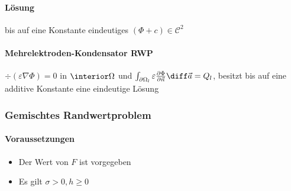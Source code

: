 \begin{sectionbox}
\begin{center}
            \paragraph{Lösung} bis auf eine Konstante eindeutiges $(\Phi + c) \in \mathcal C^2$
      \end{center}

      \paragraph{Mehrelektroden-Kondensator RWP}
      $\div(\varepsilon \nabla \Phi) = 0$ in $\interior \Omega$ und $\int_{\partial \Omega_l} \varepsilon \frac{\partial \Phi}{\partial \vec n} \diff \vec a = Q_l$, besitzt bis auf eine additive Konstante eine eindeutige Lösung

      \vspace{2mm}
      \subsubsection{Gemischtes Randwertproblem}
      \paragraph{Voraussetzungen} \begin{itemize}
            \item Der Wert von $F$ ist vorgegeben
            \item Es gilt $\sigma > 0, h\ge 0$
      \end{itemize}
      \begin{center}
      \end{center}
\end{sectionbox}

